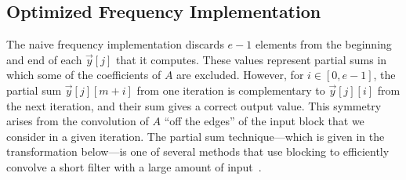 \subsection{Optimized Frequency Implementation}

The naive frequency implementation discards $e-1$ elements from the
beginning and end of each ${\vec y}[j]$ that it computes.  These
values represent partial sums in which some of the coefficients of $A$
are excluded.  However, for $i \in [0, e-1]$, the partial sum ${\vec
y}[j][m+i]$ from one iteration is complementary to ${\vec y}[j][i]$
from the next iteration, and their sum gives a correct output value.
This symmetry arises from the convolution of $A$ ``off the edges'' of
the input block that we consider in a given iteration.  The partial
sum technique---which is given in the transformation below---is one of
several methods that use blocking to efficiently convolve a short
filter with a large amount of input~\cite{oppenheim-discrete}.

